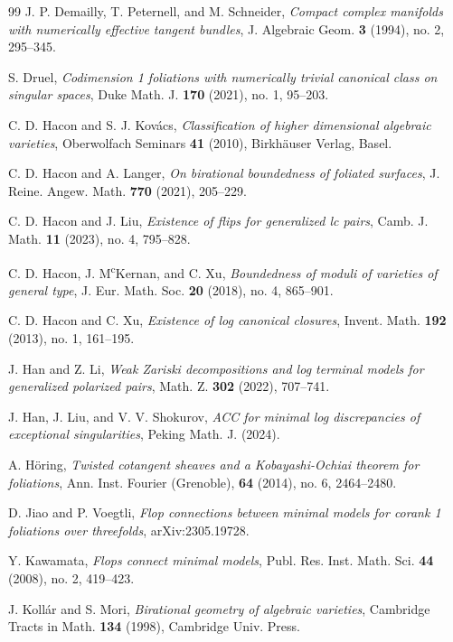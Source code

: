 \documentclass[12pt]{amsart}
\numberwithin{equation}{section}
\theoremstyle{definition}
\theoremstyle{definition}
\theoremstyle{definition}
\begin{document}
\begin{thebibliography}{99}
 J. P. Demailly, T. Peternell, and M. Schneider, \textit{Compact complex manifolds
with numerically eﬀective tangent bundles}, J. Algebraic Geom. \textbf{3} (1994), no. 2, 295--345.


 S. Druel, \textit{Codimension 1 foliations with numerically trivial canonical class on singular spaces}, Duke Math. J. \textbf{170} (2021), no. 1, 95--203.


 C. D. Hacon and S. J. Kov\'acs, \textit{Classification of higher dimensional algebraic varieties}, Oberwolfach Seminars \textbf{41} (2010), Birkh\"auser Verlag, Basel.


 C. D. Hacon and A. Langer, \textit{On birational boundedness of foliated surfaces}, J. Reine. Angew. Math. \textbf{770} (2021), 205--229.

 C. D. Hacon and J. Liu, \textit{Existence of flips for generalized lc pairs}, Camb. J. Math. \textbf{11} (2023), no. 4, 795--828.  

 C. D. Hacon, J. M\textsuperscript{c}Kernan, and C. Xu, \textit{Boundedness of moduli of varieties of general type}, J. Eur. Math. Soc. \textbf{20} (2018), no. 4, 865--901.

 C. D. Hacon and C. Xu, \textit{Existence of log canonical closures}, Invent. Math. \textbf{192} (2013), no. 1, 161--195.

 J. Han and Z. Li, \textit{Weak Zariski decompositions and log terminal models for generalized polarized pairs}, Math. Z. \textbf{302} (2022), 707--741.

 J. Han, J. Liu, and V. V. Shokurov, \textit{ACC for minimal log discrepancies of exceptional singularities}, Peking Math. J. (2024).

 A. Höring, \textit{Twisted cotangent sheaves and a Kobayashi-Ochiai theorem for foliations}, Ann. Inst. Fourier (Grenoble), \textbf{64} (2014), no. 6, 2464--2480.

 D. Jiao and P. Voegtli, \textit{Flop connections between minimal models for corank 1 foliations over threefolds}, arXiv:2305.19728.

 Y. Kawamata, \textit{Flops connect minimal models}, Publ. Res. Inst. Math. Sci. \textbf{44} (2008), no. 2, 419--423.

 J. Koll\'{a}r and S. Mori, \textit{Birational geometry of algebraic varieties}, Cambridge Tracts in Math. \textbf{134} (1998), Cambridge Univ. Press.


\end{thebibliography}
\end{document}
